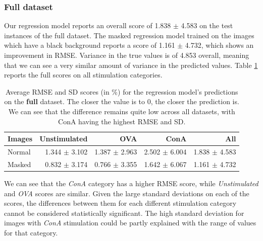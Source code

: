 \bigskip
\subsubsection{Full dataset}
\hfill
\hfill 

Our regression model reports an overall score of 1.838 $\pm$ 4.583 on the test instances of the full dataset. The masked regression model trained on the images which have a black background reports a score of 1.161 $\pm$ 4.732, which shows an improvement in RMSE. Variance in the true values is of 4.853 overall, meaning that we can see a very similar amount of variance in the predicted values. Table \ref{tab:full_rmse} reports the full scores on all stimulation categories. 

\begin{table}[h!]
\centering
\caption{Average RMSE and SD scores (in \%) for the regression model's predictions on the \textbf{full} dataset. The closer the value is to 0, the closer the prediction is. We can see that the difference remains quite low across all datasets, with ConA having the highest RMSE and SD.}
\label{tab:full_rmse}
\begin{tabular}{l|rrr|r}
\rowcolor[HTML]{EFEFEF}
\textbf{Images} & \cellcolor[HTML]{FFCCC9}\textbf{Unstimulated} & \cellcolor[HTML]{C9FFCB}\textbf{OVA} & \cellcolor[HTML]{96FFFB}\textbf{ConA} & \textbf{All} \\ \hline
Normal      & 1.344 $\pm$ 3.102  & 1.387 $\pm$ 2.963   & 2.502 $\pm$ 6.004  &   1.838 $\pm$ 4.583  \\ \hline
Masked      &    0.832 $\pm$ 3.174          & 0.766 $\pm$ 3.355  &  1.642 $\pm$ 6.067   &   1.161 $\pm$ 4.732 
\end{tabular}
\end{table}

We can see that the \textit{ConA} category has a higher RMSE score, while \textit{Unstimulated} and \textit{OVA} scores are similar. Given the large standard deviations on each of the scores, the differences between them for each different stimulation category cannot be considered statistically significant. The high standard deviation for images with \textit{ConA} stimulation could be partly explained with the range of values for that category. 

